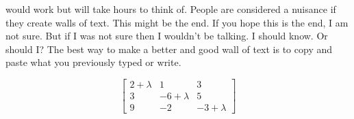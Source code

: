 \documentclass[11pt]{article}
\begin{document}
\begin{center}
would work but will take hours to think of. People are considered a nuisance if they create walls of text. This might be the end. If you hope this is the end, I am not sure. But if I was not sure then I wouldn't be talking. I should know. Or should I? The best way to make a better and good wall of text is to copy and paste what you previously typed or write.
\end{center}
\newpage
$$\left[\begin{array}{ccc}
2+\lambda&1&3\\
3&-6+\lambda&5\\
9&-2&-3+\lambda
\end{array}\right]$$



\end{document}
